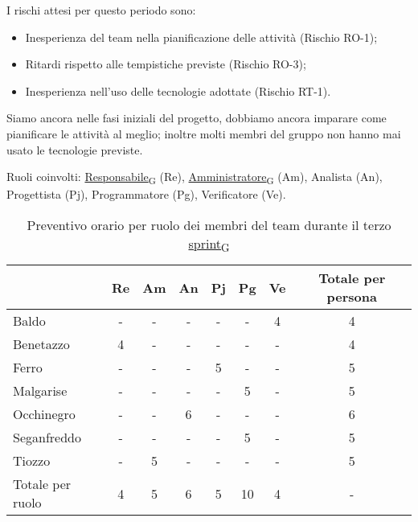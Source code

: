 I rischi attesi per questo periodo sono:
\begin{itemize}
	\item Inesperienza del team nella pianificazione delle attività (Rischio RO-1);
	\item Ritardi rispetto alle tempistiche previste (Rischio RO-3);
	\item Inesperienza nell'uso delle tecnologie adottate (Rischio RT-1).
\end{itemize}
Siamo ancora nelle fasi iniziali del progetto, dobbiamo ancora imparare come pianificare le attività al meglio; inoltre molti membri del gruppo non hanno mai usato le tecnologie previste.

Ruoli coinvolti: \href{https://7last.github.io/docs/rtb/documentazione-interna/glossario\#responsabile}{Responsabile\textsubscript{G}} (Re), \href{https://7last.github.io/docs/rtb/documentazione-interna/glossario\#amministratore}{Amministratore\textsubscript{G}} (Am), Analista (An), Progettista (Pj), Programmatore (Pg), Verificatore (Ve).
\begin{table}[!h]
	\centering
	\begin{tabular}{ | l | c | c | c | c | c | c | c | }
		\hline
		\textbf{}        & \textbf{Re} & \textbf{Am} & \textbf{An} & \textbf{Pj} & \textbf{Pg} & \textbf{Ve} & \textbf{Totale per persona} \\
		\hline
		Baldo            & -           & -           & -           & -           & -           & 4           & 4                           \\
		Benetazzo        & 4           & -           & -           & -           & -           & -           & 4                           \\
		Ferro            & -           & -           & -           & 5           & -           & -           & 5                           \\
		Malgarise        & -           & -           & -           & -           & 5           & -           & 5                           \\
		Occhinegro       & -           & -           & 6           & -           & -           & -           & 6                           \\
		Seganfreddo      & -           & -           & -           & -           & 5           & -           & 5                           \\
		Tiozzo           & -           & 5           & -           & -           & -           & -           & 5                           \\
		\hline
		Totale per ruolo & 4           & 5           & 6           & 5           & 10          & 4           & -                           \\
		\hline
	\end{tabular}
	\caption{Preventivo orario per ruolo dei membri del team durante il terzo \href{https://7last.github.io/docs/rtb/documentazione-interna/glossario\#sprint}{sprint\textsubscript{G}}}
	
\end{table}

